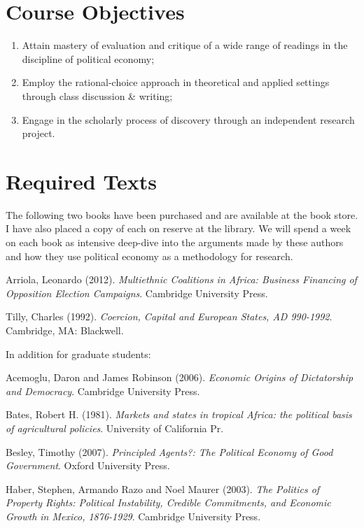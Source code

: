 \documentclass[11pt,]{article}
\begin{document}
\section{Course Objectives}\label{course-objectives}

\begin{enumerate}
\def\labelenumi{\arabic{enumi}.}
\item
  Attain mastery of evaluation and critique of a wide range of readings
  in the discipline of political economy;
\item
  Employ the rational-choice approach in theoretical and applied
  settings through class discussion \& writing;
\item
  Engage in the scholarly process of discovery through an independent
  research project.
\end{enumerate}

\section{Required Texts}\label{required-texts}

The following two books have been purchased and are available at the
book store. I have also placed a copy of each on reserve at the library.
We will spend a week on each book as intensive deep-dive into the
arguments made by these authors and how they use political economy as a
methodology for research.

Arriola, Leonardo (2012).
\emph{Multiethnic Coalitions in Africa: Business Financing of Opposition Election Campaigns}.
Cambridge University Press.

Tilly, Charles (1992).
\emph{Coercion, Capital and European States, AD 990-1992}. Cambridge,
MA: Blackwell.

In addition for graduate students:

Acemoglu, Daron and James Robinson (2006).
\emph{Economic Origins of Dictatorship and Democracy}. Cambridge
University Press.

Bates, Robert H. (1981).
\emph{Markets and states in tropical Africa: the political basis of agricultural policies}.
University of California Pr.

Besley, Timothy (2007).
\emph{Principled Agents?: The Political Economy of Good Government}.
Oxford University Press.

Haber, Stephen, Armando Razo and Noel Maurer (2003).
\emph{The Politics of Property Rights: Political Instability, Credible Commitments, and Economic Growth in Mexico, 1876-1929}.
Cambridge University Press.
\end{document}
